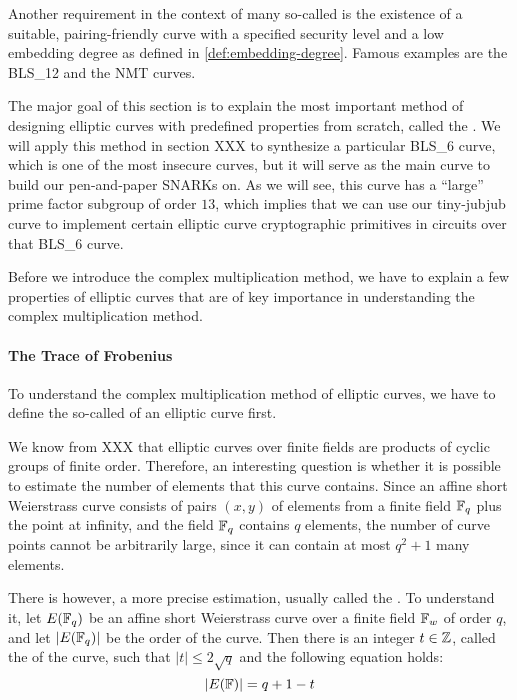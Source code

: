 Another requirement in the context of many so-called  is the existence of a suitable, pairing-friendly curve with a specified security level and a low embedding degree as defined in \ref{def:embedding-degree}. Famous examples are the BLS\_12 and the NMT curves.

The major goal of this section is to explain the most important method of designing elliptic curves with predefined properties from scratch, called the . We will apply this method in section XXX to synthesize a particular BLS\_6 curve, which is one of the most insecure curves, but it will serve as the main curve to build our pen-and-paper SNARKs on. As we will see, this curve has a ``large'' prime factor subgroup of order $13$, which implies that we can use our tiny-jubjub curve to implement certain elliptic curve cryptographic primitives in circuits over that BLS\_6 curve. 
 
Before we introduce the complex multiplication method, we have to explain a few properties of elliptic curves that are of key importance in understanding the complex multiplication method. 

\paragraph{The Trace of Frobenius} To understand the complex multiplication method of elliptic curves, we have to define the so-called  of an elliptic curve first.

We know from XXX that elliptic curves over finite fields are products of cyclic groups of finite order. Therefore, an interesting question is whether it is possible to estimate the number of elements that this curve contains. Since an affine short Weierstrass curve consists of pairs $(x,y)$ of elements from a finite field $\mathbb{F}_q$ plus the point at infinity, and the field $\mathbb{F}_q$ contains $q$ elements, the number of curve points cannot be arbitrarily large, since it can contain at most $q^2+1$ many elements. 

There is however, a more precise estimation, usually called the . To understand it, let $E(\mathbb{F}_q)$ be an affine short Weierstrass curve over a finite field $\mathbb{F}_w$ of order $q$, and let $|E(\mathbb{F}_q)|$ be the order of the curve. Then there is an integer $t\in \mathbb{Z}$, called the  of the curve, such that $|t| \leq 2\sqrt{q}$ and the following equation holds:
\begin{equation}\label{hasse-bound}
|E(\mathbb{F})| = q +1 -t
\end{equation}

